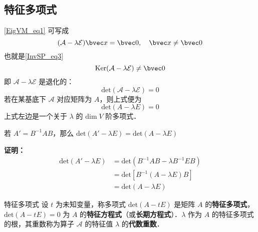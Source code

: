 \subsection{特征多项式}
\autoref{EigVM_eq1} 可写成
\begin{equation}
(\mathcal{A-\lambda E})\bvec x=\bvec 0,\quad \bvec x\neq\bvec 0
\end{equation}
也就是\autoref{InvSP_eq3}~ 
\begin{equation}
\mathrm{Ker(\mathcal{A}-\lambda\mathcal{E})}\neq\bvec 0
\end{equation}
即 $\mathcal{A-\lambda E}$ 是退化的：
\begin{equation}
\mathrm{det}(\mathcal{A-\lambda E})=0
\end{equation}
若在某基底下 $\mathcal{A}$ 对应矩阵为 $A$，则上式便为
\begin{equation}\label{EigVM_eq2}
\mathrm{det}(A-\lambda E)=0
\end{equation}
上式左边是一个关于 $\lambda$ 的 $\mathrm{dim}\;{V}$ 阶多项式．
\begin{theorem}{}
若 $A'=B^{-1}AB$，那么 $\mathrm{det}(A'-\lambda E)=\mathrm{det}(A-\lambda E)$
\end{theorem}
\textbf{证明：}
\begin{equation}
\begin{aligned}
\mathrm{det}(A'-\lambda E)&=\mathrm{det}(B^{-1}AB-\lambda B^{-1}EB)\\
&=\mathrm{det}[B^{-1}(A-\lambda E)B]\\
&=\mathrm{det}(A-\lambda E)
\end{aligned}
\end{equation}
\begin{definition}{特征多项式}
设 $t$ 为未知变量，称多项式 $\mathrm{det}(A-tE)$ 是矩阵 $A$ 的\textbf{特征多项式}，$\mathrm{det}(A-tE)=0$ 为 $A$ 的\textbf{特征方程式}（或\textbf{长期方程式}）．$\lambda$ 作为 $A$ 的特征多项式的根，其重数称为算子 $\mathcal{A}$ 的特征值 $\lambda$ 的\textbf{代数重数}．
\end{definition}